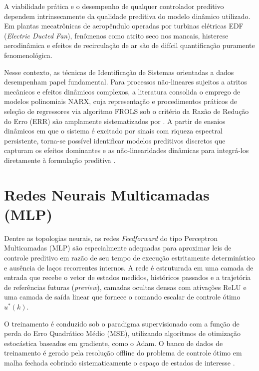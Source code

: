 A viabilidade prática e o desempenho de qualquer controlador preditivo dependem intrinsecamente da qualidade preditiva do modelo dinâmico utilizado. Em plantas mecatrônicas de aeropêndulo operadas por turbinas elétricas EDF (\textit{Electric Ducted Fan}), fenômenos como atrito seco nos mancais, histerese aerodinâmica e efeitos de recirculação de ar são de difícil quantificação puramente fenomenológica.

Nesse contexto, as técnicas de Identificação de Sistemas orientadas a dados desempenham papel fundamental. Para processos não-lineares sujeitos a atritos mecânicos e efeitos dinâmicos complexos, a literatura consolida o emprego de modelos polinomiais NARX, cuja representação e procedimentos práticos de seleção de regressores via algoritmo FROLS sob o critério da Razão de Redução do Erro (ERR) são amplamente sistematizados por . A partir de ensaios dinâmicos em que o sistema é excitado por sinais com riqueza espectral persistente, torna-se possível identificar modelos preditivos discretos que capturam os efeitos dominantes e as não-linearidades dinâmicas para integrá-los diretamente à formulação preditiva \cite{ljung1999}.

\section{Redes Neurais Multicamadas (MLP)}
\label{sec:fund_mlp}

Dentre as topologias neurais, as redes \textit{Feedforward} do tipo Perceptron Multicamadas (MLP) são especialmente adequadas para aproximar leis de controle preditivo em razão de seu tempo de execução estritamente determinístico e ausência de laços recorrentes internos. A rede é estruturada em uma camada de entrada que recebe o vetor de estados medidos, históricos passados e a trajetória de referências futuras (\textit{preview}), camadas ocultas densas com ativações ReLU e uma camada de saída linear que fornece o comando escalar de controle ótimo $u^*(k)$.

O treinamento é conduzido sob o paradigma supervisionado com a função de perda do Erro Quadrático Médio (MSE), utilizando algoritmos de otimização estocástica baseados em gradiente, como o Adam. O banco de dados de treinamento é gerado pela resolução offline do problema de controle ótimo em malha fechada cobrindo sistematicamente o espaço de estados de interesse \cite{karg2020}.

